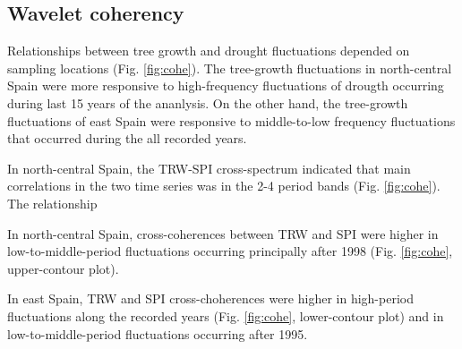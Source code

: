 \documentclass[review,authoryear]{elsarticle}
\begin{document}
\subsection{Wavelet coherency}
Relationships between tree growth and drought fluctuations depended on
sampling locations (Fig. \ref{fig:cohe}). The tree-growth fluctuations
in north-central Spain were more responsive to high-frequency
fluctuations of drougth occurring during last 15 years of the
ananlysis. On the other hand, the tree-growth fluctuations of east
Spain were responsive to middle-to-low frequency fluctuations that
occurred during the all recorded years.

In north-central Spain, the \gls{TRW}-\gls{SPI} cross-spectrum
indicated that main correlations in the two time series was in the 2-4
period bands (Fig. \ref{fig:cohe}). The relationship


In north-central Spain, cross-coherences between \gls{TRW} and
\gls{SPI} were higher in low-to-middle-period fluctuations occurring
principally after 1998 (Fig. \ref{fig:cohe}, upper-contour
plot). 

In east Spain, \gls{TRW} and \gls{SPI} cross-choherences were higher
in high-period fluctuations along the recorded years
(Fig. \ref{fig:cohe}, lower-contour plot) and in low-to-middle-period
fluctuations occurring after 1995.



\newpage
\section{\refname}


\end{document}
